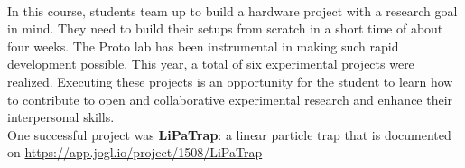 \documentclass{report}
\begin{document}
\clearpage
\begin{figure}
    \centering
\end{figure}
\clearpage

 \\

In this course, students team up to build a hardware project with a research goal in mind. They need to build their setups from scratch in a short time of about four weeks. The Proto lab has been instrumental in making such rapid development possible. This year, a total of six experimental projects were realized.
Executing these projects is an opportunity for the student to learn how to contribute to open and collaborative experimental research and enhance their interpersonal skills. \\ 

One successful project was \textbf{LiPaTrap}: a linear particle trap that is documented on \url{https://app.jogl.io/project/1508/LiPaTrap}
\end{document}
